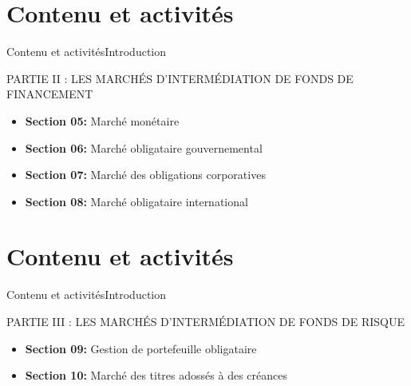 \documentclass{beamer}
\begin{document}
\section{Contenu et activités}
\begin{frame}{Contenu et activités}{Introduction}
  \begin{block}{PARTIE II : LES MARCHÉS D'INTERMÉDIATION DE FONDS DE FINANCEMENT}
\begin{itemize}
\item \textbf{Section 05:} Marché monétaire
\item \textbf{Section 06:} Marché obligataire gouvernemental
\item \textbf{Section 07:} Marché des obligations corporatives
\item \textbf{Section 08:} Marché obligataire international
\end{itemize}
\end{block}
\end{frame}


\section{Contenu et activités}
\begin{frame}{Contenu et activités}{Introduction}
  \begin{block}{PARTIE III : LES MARCHÉS D'INTERMÉDIATION DE FONDS DE RISQUE}
\begin{itemize}
\item \textbf{Section 09:} Gestion de portefeuille obligataire
\item \textbf{Section 10:} Marché des titres adossés à des créances
\end{itemize}
\end{block}
\end{frame}
\end{document}
